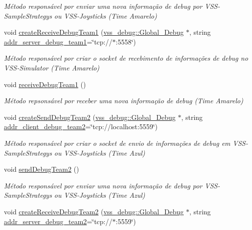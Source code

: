 \begin{DoxyCompactItemize}
\begin{DoxyCompactList}\small\item\em Método responsável por enviar uma nova informação de debug por V\+S\+S-\/\+Sample\+Strategys ou V\+S\+S-\/\+Joysticks (Time Amarelo) \end{DoxyCompactList}\item 
void \hyperlink{classInterface_a4b07f8e387443775616852835c78c46d}{create\+Receive\+Debug\+Team1} (\hyperlink{classvss__debug_1_1Global__Debug}{vss\+\_\+debug\+::\+Global\+\_\+\+Debug} $\ast$, string \hyperlink{classInterface_a5e15dc6d237ba5658b621a9267834058}{addr\+\_\+server\+\_\+debug\+\_\+team1}=\char`\"{}tcp\+://$\ast$\+:5558\char`\"{})
\begin{DoxyCompactList}\small\item\em Método responsável por criar o socket de recebimento de informações de debug no V\+S\+S-\/\+Simulator (Time Amarelo) \end{DoxyCompactList}\item 
void \hyperlink{classInterface_a1eaedc1aeabb71b4d7277e7588fdba1b}{receive\+Debug\+Team1} ()
\begin{DoxyCompactList}\small\item\em Método repsonsável por receber uma nova informação de debug (Time Amarelo) \end{DoxyCompactList}\item 
void \hyperlink{classInterface_aef81f08baa4c895699209a4ac884c7c3}{create\+Send\+Debug\+Team2} (\hyperlink{classvss__debug_1_1Global__Debug}{vss\+\_\+debug\+::\+Global\+\_\+\+Debug} $\ast$, string \hyperlink{classInterface_a7c52d0df38af915072bfa3d25539dd74}{addr\+\_\+client\+\_\+debug\+\_\+team2}=\char`\"{}tcp\+://localhost\+:5559\char`\"{})
\begin{DoxyCompactList}\small\item\em Método responsável por criar o socket de envio de informações de debug em V\+S\+S-\/\+Sample\+Strategys ou V\+S\+S-\/\+Joysticks (Time Azul) \end{DoxyCompactList}\item 
void \hyperlink{classInterface_a37b63efacc3c2c0dbaef26cc56c72fd8}{send\+Debug\+Team2} ()
\begin{DoxyCompactList}\small\item\em Método responsável por enviar uma nova informação de debug por V\+S\+S-\/\+Sample\+Strategys ou V\+S\+S-\/\+Joysticks (Time Azul) \end{DoxyCompactList}\item 
void \hyperlink{classInterface_afa3f9885ad6f4ca7f1958d0c578c84b9}{create\+Receive\+Debug\+Team2} (\hyperlink{classvss__debug_1_1Global__Debug}{vss\+\_\+debug\+::\+Global\+\_\+\+Debug} $\ast$, string \hyperlink{classInterface_a4c71300b21d6f2e9cbfdef12cbf01c71}{addr\+\_\+server\+\_\+debug\+\_\+team2}=\char`\"{}tcp\+://$\ast$\+:5559\char`\"{})

\end{DoxyCompactItemize}
